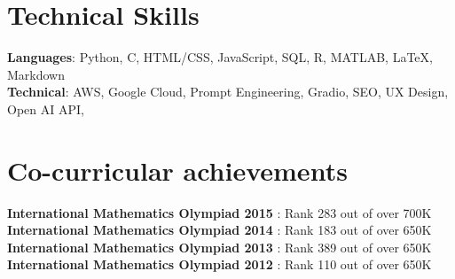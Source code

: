 \documentclass[letterpaper,11pt]{article}
\begin{document}
\section{\textbf{\textcolor{myColor1}{Technical Skills}}}
 \begin{itemize}[leftmargin=0.15in, label={}]
    \small{\item{
     \textbf{Languages}{: Python, C, HTML/CSS, JavaScript, SQL, R, MATLAB, LaTeX, Markdown} \\
     \textbf{Technical}{: AWS, Google Cloud, Prompt Engineering, Gradio, SEO, UX Design, Open AI API,} \\
    }}
 \end{itemize} \vspace{-20pt}
\section{\textbf{\textcolor{myColor1}{Co-curricular achievements}}}
 \begin{itemize}[leftmargin=0.15in, label={}]
    \small{\item{
     \textbf{International Mathematics Olympiad 2015} : Rank 283 out of over 700K \\
     \textbf{International Mathematics Olympiad 2014} : Rank 183 out of over 650K \\
     \textbf{International Mathematics Olympiad 2013} : Rank 389 out of over 650K \\
     \textbf{International Mathematics Olympiad 2012} : Rank 110 out of over 650K \\
    }}
 \end{itemize} \vspace{-12pt}
\end{document}
